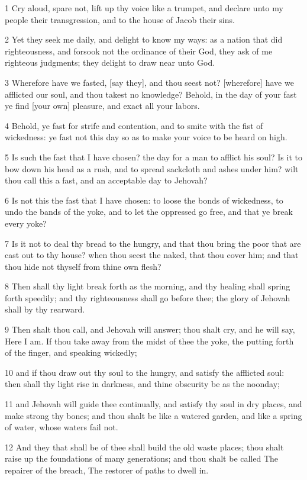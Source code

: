 \par 1 Cry aloud, spare not, lift up thy voice like a trumpet, and declare unto my people their transgression, and to the house of Jacob their sins.
\par 2 Yet they seek me daily, and delight to know my ways: as a nation that did righteousness, and forsook not the ordinance of their God, they ask of me righteous judgments; they delight to draw near unto God.
\par 3 Wherefore have we fasted, [say they], and thou seest not? [wherefore] have we afflicted our soul, and thou takest no knowledge? Behold, in the day of your fast ye find [your own] pleasure, and exact all your labors.
\par 4 Behold, ye fast for strife and contention, and to smite with the fist of wickedness: ye fast not this day so as to make your voice to be heard on high.
\par 5 Is such the fast that I have chosen? the day for a man to afflict his soul? Is it to bow down his head as a rush, and to spread sackcloth and ashes under him? wilt thou call this a fast, and an acceptable day to Jehovah?
\par 6 Is not this the fast that I have chosen: to loose the bonds of wickedness, to undo the bands of the yoke, and to let the oppressed go free, and that ye break every yoke?
\par 7 Is it not to deal thy bread to the hungry, and that thou bring the poor that are cast out to thy house? when thou seest the naked, that thou cover him; and that thou hide not thyself from thine own flesh?
\par 8 Then shall thy light break forth as the morning, and thy healing shall spring forth speedily; and thy righteousness shall go before thee; the glory of Jehovah shall by thy rearward.
\par 9 Then shalt thou call, and Jehovah will answer; thou shalt cry, and he will say, Here I am. If thou take away from the midst of thee the yoke, the putting forth of the finger, and speaking wickedly;
\par 10 and if thou draw out thy soul to the hungry, and satisfy the afflicted soul: then shall thy light rise in darkness, and thine obscurity be as the noonday;
\par 11 and Jehovah will guide thee continually, and satisfy thy soul in dry places, and make strong thy bones; and thou shalt be like a watered garden, and like a spring of water, whose waters fail not.
\par 12 And they that shall be of thee shall build the old waste places; thou shalt raise up the foundations of many generations; and thou shalt be called The repairer of the breach, The restorer of paths to dwell in.
